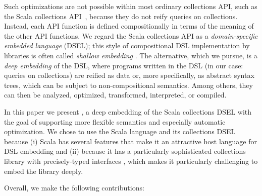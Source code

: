 Such optimizations are not possible within most ordinary collections API, such as the Scala collections API~\cite{odersky2009fighting}, because they
do not reify queries on collections. Instead, each API function is defined compositionally in terms
of the meaning of the other API functions.
We regard the Scala collections API as a \emph{domain-specific embedded language} (DSEL); this style of compositional DSL implementation by libraries is often
called \emph{shallow embedding}%
. The alternative, which we pursue, is a \emph{deep embedding} of the DSL, where programs written in the DSL (in our case: 
queries on collections) are reified as data or, more specifically, as abstract syntax trees, which can be subject to non-compositional semantics. Among others, they can then be analyzed, optimized, transformed, interpreted, or compiled.

In this paper we present \LoS, a deep embedding of the Scala collections DSEL with the goal of supporting more flexible semantics and especially automatic optimization.
We chose to use the Scala language and its collections DSEL because (i) Scala has several features that make it an attractive host language for DSL embedding \citep{Odersky11book} and (ii) because it has a particularly sophisticated collections library with precisely-typed interfaces \citep{odersky2009fighting}, which makes it particularly challenging to embed the library deeply.




Overall, we make the following contributions:



